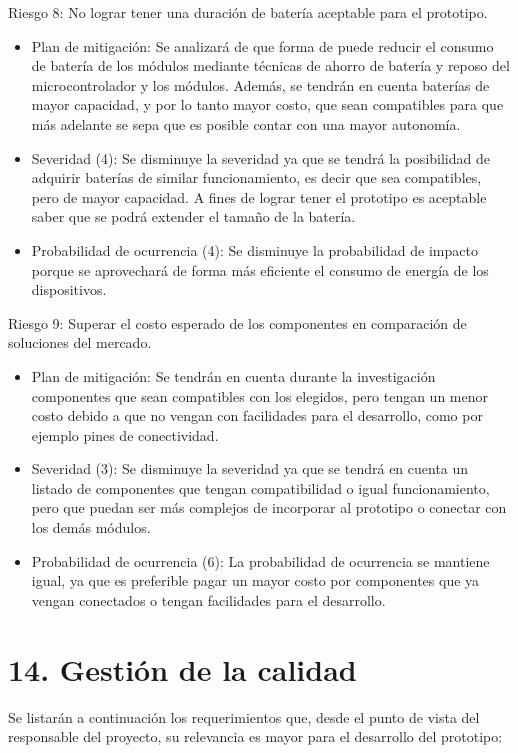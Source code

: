 \documentclass[
11pt, %
]{charter}
\begin{document}
Riesgo 8: No lograr tener una duración de batería aceptable para el prototipo.
\begin{itemize}
	\item Plan de mitigación: Se analizará de que forma de puede reducir el consumo de batería de los módulos mediante técnicas de ahorro de batería y reposo del microcontrolador y los módulos. Además, se tendrán en cuenta baterías de mayor capacidad, y por lo tanto mayor costo, que sean compatibles para que más adelante se sepa que es posible contar con una mayor autonomía.
	\item Severidad (4): Se disminuye la severidad ya que se tendrá la posibilidad de adquirir baterías de similar funcionamiento, es decir que sea compatibles, pero de mayor capacidad. A fines de lograr tener el prototipo es aceptable saber que se podrá extender el tamaño de la batería.
	\item Probabilidad de ocurrencia (4): Se disminuye la probabilidad de impacto porque se aprovechará de forma más eficiente el consumo de energía de los dispositivos.
\end{itemize}

Riesgo 9: Superar el costo esperado de los componentes en comparación de soluciones del mercado.
\begin{itemize}
	\item Plan de mitigación: Se tendrán en cuenta durante la investigación componentes que sean compatibles con los elegidos, pero tengan un menor costo debido a que no vengan con facilidades para el desarrollo, como por ejemplo pines de conectividad.
	\item Severidad (3): Se disminuye la severidad ya que se tendrá en cuenta un listado de componentes que tengan compatibilidad o igual funcionamiento, pero que puedan ser más complejos de incorporar al prototipo o conectar con los demás módulos.
	\item Probabilidad de ocurrencia (6): La probabilidad de ocurrencia se mantiene igual, ya que es preferible pagar un mayor costo por componentes que ya vengan conectados o tengan facilidades para el desarrollo.
\end{itemize}

\section{14. Gestión de la calidad}
\label{sec:calidad}

Se listarán a continuación los requerimientos que, desde el punto de vista del responsable del proyecto, su relevancia es mayor para el desarrollo del prototipo:
\end{document}
